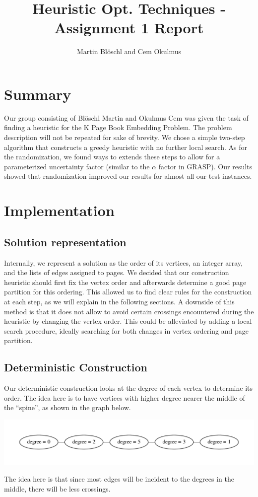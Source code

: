 \documentclass [11pt]{article}
\begin{document}
\title{ Heuristic Opt. Techniques - Assignment 1 Report}
\author{ Martin Blöschl and Cem Okulmus }

\maketitle
\thispagestyle{empty}

\section{Summary}
Our group consisting of Blöschl Martin and Okulmus Cem was given the task of finding a heuristic for the K Page Book Embedding Problem. The problem description will not be repeated for sake of brevity. We chose a simple two-step algorithm that constructs a greedy heuristic with no further local search. As for the randomization, we found ways to extends these steps to allow for a parameterized uncertainty factor (similar to the $\alpha$ factor in GRASP). 
Our results showed that randomization improved our results for almost all our test instances. 

\section{Implementation}

\subsection{Solution representation}
Internally, we represent a solution as the order of its vertices, an integer array, and the lists of edges assigned to pages. We decided that our construction heuristic should first fix the vertex order and afterwards determine a good page partition for this ordering. This allowed us to find clear rules for the construction at each step, as we will explain in the following sections. A downside of this method is that it does not allow to avoid certain crossings encountered during the heuristic by changing the vertex order. This could be alleviated by adding a local search procedure, ideally searching for both changes in vertex ordering and page partition. 

\subsection{Deterministic Construction}

Our deterministic construction looks at the degree of each vertex to determine its order. The idea here is to have vertices with higher degree nearer the middle of the ``spine'', as shown in the graph below. 
\begin{center}
    \includegraphics[scale=0.6]{bilder/graph.pdf}
\end{center}
The idea here is that since most edges will be incident to the degrees in the middle, there will be less crossings. 
\end{document}
